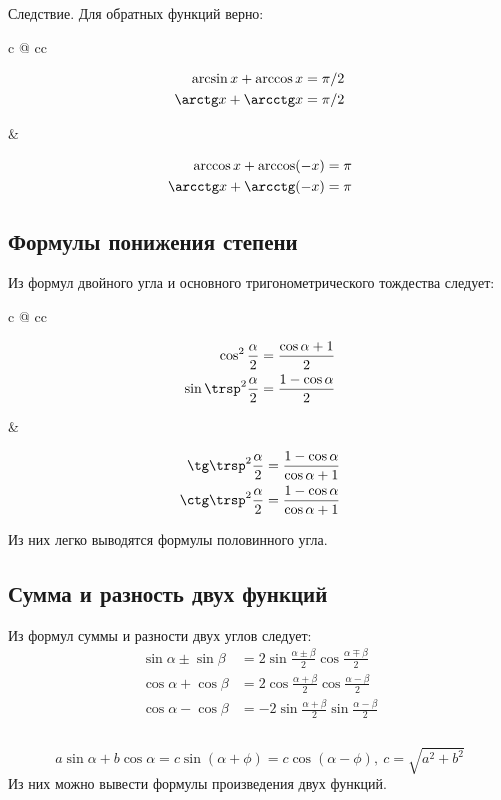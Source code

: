 {\bold Следствие.} Для обратных функций верно:\par
\begin{tabularc}{0pt}{0pt}{c @{\quad\quad} c}{c}
\parbox{136pt}{\begin{align*}
\arcsin x+\arccos x&=\pi/2\\
\arctg x+\arcctg x&=\pi/2
\end{align*}} &
\parbox{143pt}{\begin{align*}
\arccos x+\arccos(-x)&=\pi\\
\arcctg x+\arcctg(-x)&=\pi
\end{align*}}
\end{tabularc}

\vspace*{-6pt}
\subsection{Формулы понижения степени}

Из формул двойного угла и основного тригонометрического тождества следует:\par
\begin{tabularc}{0pt}{0pt}{c @{\quad\quad} c}{c}
\parbox{102pt}{\begin{align*}
\cos^2\frac{\alpha}{2}&=\frac{\cos\alpha+1}{2}\\
\sin\trsp^2\frac{\alpha}{2}&=\frac{1-\cos\alpha}{2}
\end{align*}} &

\parbox{102pt}{\begin{align*}
\tg\trsp^2\frac{\alpha}{2}&=\frac{1-\cos\alpha}{\cos\alpha+1}\\
\ctg\trsp^2\frac{\alpha}{2}&=\frac{1-\cos\alpha}{\cos\alpha+1}
\end{align*}}
\end{tabularc}

Из них легко выводятся формулы {\ital половинного угла}.

\subsection{Сумма и разность двух функций}

Из формул суммы и разности двух углов следует:
\begin{align*}
\sin\alpha\pm\sin\beta&=2\sin\frac{\alpha\pm\beta}{2}\cos\frac{\alpha\mp\beta}{2}\\[-2pt]
\cos\alpha+\cos\beta&=2\cos\frac{\alpha+\beta}{2}\cos\frac{\alpha-\beta}{2}\\[-2pt]
\cos\alpha-\cos\beta&=-2\sin\frac{\alpha+\beta}{2}\sin\frac{\alpha-\beta}{2}\\
\end{align*}\\[-34pt]
$$a\sin\alpha+b\cos\alpha=c\sin(\alpha+\phi)=c\cos(\alpha-\phi),\ c=\sqrt{a^2+b^2}$$
Из них можно вывести формулы {\ital произведения двух функций}.

